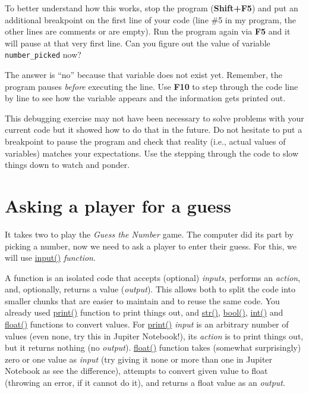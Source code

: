 \documentclass[
]{book}
\begin{document}
To better understand how this works, stop the program (\textbf{Shift+F5}) and put an additional breakpoint on the first line of your code (line \#5 in my program, the other lines are comments or are empty). Run the program again via \textbf{F5} and it will pause at that very first line. Can you figure out the value of variable \texttt{number\_picked} now?

The answer is ``no'' because that variable does not exist yet. Remember, the program pauses \emph{before} executing the line. Use \textbf{F10} to step through the code line by line to see how the variable appears and the information gets printed out.

This debugging exercise may not have been necessary to solve problems with your current code but it showed how to do that in the future. Do not hesitate to put a breakpoint to pause the program and check that reality (i.e., actual values of variables) matches your expectations. Use the stepping through the code to slow things down to watch and ponder.

\hypertarget{input-function}{%
\section{Asking a player for a guess}\label{input-function}}

It takes two to play the \emph{Guess the Number} game. The computer did its part by picking a number, now we need to ask a player to enter their guess. For this, we will use \href{https://docs.python.org/3/library/functions.html\#input}{input()} \emph{function}.

A function is an isolated code that accepts (optional) \emph{inputs}, performs an \emph{action}, and, optionally, returns a value (\emph{output}). This allows both to split the code into smaller chunks that are easier to maintain and to reuse the same code. You already used \href{https://docs.python.org/3/library/functions.html\#print}{print()} function to print things out, and \href{https://docs.python.org/3/library/functions.html\#func-str}{str()}, \href{https://docs.python.org/3/library/functions.html\#bool}{bool()}, \href{https://docs.python.org/3/library/functions.html\#int}{int()} and \href{https://docs.python.org/3/library/functions.html\#float}{float()} functions to convert values. For \href{https://docs.python.org/3/library/functions.html\#print}{print()} \emph{input} is an arbitrary number of values (even none, try this in Jupiter Notebook!), its \emph{action} is to print things out, but it returns nothing (no \emph{output}). \href{https://docs.python.org/3/library/functions.html\#float}{float()} function takes (somewhat surprisingly) zero or one value as \emph{input} (try giving it none or more than one in Jupiter Notebook as see the difference), attempts to convert given value to float (throwing an error, if it cannot do it), and returns a float value as an \emph{output}.
\end{document}
